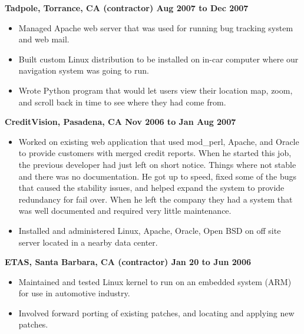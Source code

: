 \documentclass{res}
\begin{document}
\begin{resume}
{\large \bf Tadpole, Torrance, CA (contractor) \hfill Aug 2007 to Dec 2007}
\begin{itemize}

\item Managed Apache web server that was used for running bug
tracking system and web mail.

\item Built custom Linux distribution to be installed on in-car
computer where our navigation system was going to run.

\item Wrote Python program that would let users view their location
map, zoom, and scroll back in time to see where they had come from.


\end{itemize}

{\large \bf CreditVision, Pasadena, CA \hfill Nov 2006 to Jan Aug 2007}
\begin{itemize}
\item
Worked on existing web application that used mod\_perl, Apache, and Oracle to
provide customers with merged credit reports.  When he started this
job, the previous developer had just left on short notice.  Things where
not stable and there was no documentation.  He got up to speed, fixed some
of the bugs that caused the stability issues, and helped expand the system
to provide redundancy for fail over.  When he left the company they had
a system that was well documented and required very little maintenance.

\item
Installed and administered Linux, Apache, Oracle, Open BSD on off
site server located in a nearby data center.

\end{itemize}

{\large \bf ETAS, Santa Barbara, CA (contractor) \hfill Jan 20 to Jun 2006}
\begin{itemize}
\item Maintained and tested Linux kernel to run on an embedded
system (ARM) for use in automotive industry.
\item Involved forward porting of existing patches, and locating and applying
new patches.
\end{itemize}



\end{resume}
\end{document}
